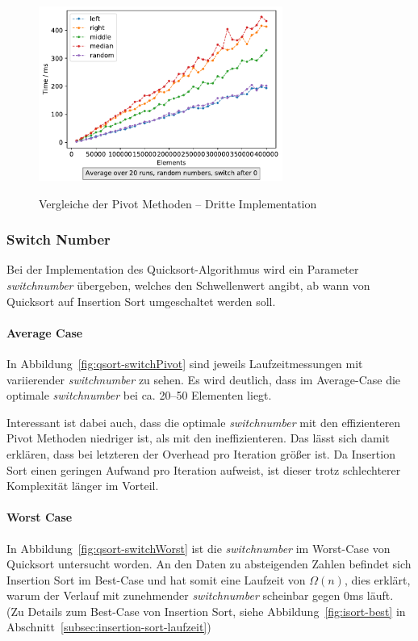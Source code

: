 \begin{figure}[hbt]
    \centering
    \caption{Vergleiche der Pivot Methoden -- Dritte Implementation}
    \includegraphics[width=8cm]
    {../out/pivotMethods.pdf}\label{fig:qsort-impl3-2}
\end{figure}

\FloatBarrier

\subsubsection{Switch Number}\label{subsubsec:switch-number}
Bei der Implementation des Quicksort-Algorithmus wird ein Parameter
\textit{switchnumber} übergeben, welches den Schwellenwert angibt, ab wann
von Quicksort auf Insertion Sort umgeschaltet werden soll.

\paragraph{Average Case}
In Abbildung~\ref{fig:qsort-switchPivot} sind
jeweils Laufzeitmessungen mit variierender \textit{switchnumber} zu sehen.
Es wird deutlich, dass im Average-Case die optimale \textit{switchnumber} bei
ca. 20--50 Elementen liegt.

Interessant ist dabei auch, dass die optimale \textit{switchnumber} mit den
effizienteren Pivot Methoden niedriger ist, als mit den ineffizienteren.
Das lässt sich damit erklären, dass bei letzteren der Overhead pro Iteration
größer ist.
Da Insertion Sort einen geringen Aufwand pro Iteration aufweist, ist dieser
trotz schlechterer Komplexität länger im Vorteil.

\paragraph{Worst Case}
In Abbildung~\ref{fig:qsort-switchWorst} ist die \textit{switchnumber} im
Worst-Case von Quicksort untersucht worden.
An den Daten zu absteigenden Zahlen befindet sich Insertion Sort im Best-Case
und hat somit eine Laufzeit von \(\Omega(n)\), dies erklärt, warum der
Verlauf mit zunehmender \textit{switchnumber} scheinbar gegen 0ms läuft.
(Zu Details zum Best-Case von Insertion Sort, siehe
Abbildung~\ref{fig:isort-best} in
Abschnitt~\ref{subsec:insertion-sort-laufzeit})

